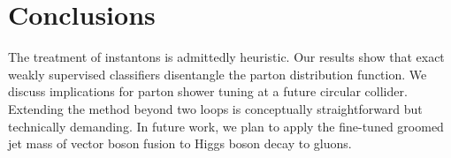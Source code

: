 \section{Conclusions}\label{sec:conclusions}

The treatment of instantons is admittedly heuristic. Our results show
that exact weakly supervised classifiers disentangle the parton
distribution function. We discuss implications for parton shower tuning
at a future circular collider. Extending the method beyond two loops is
conceptually straightforward but technically demanding. In future work,
we plan to apply the fine-tuned groomed jet mass of vector boson fusion
to Higgs boson decay to gluons.

